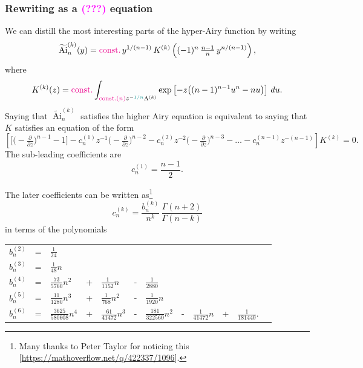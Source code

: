\documentclass{article}
\DeclareMathOperator{\Ai}{Ai}
\begin{document}
\subsubsection{Rewriting as a \textcolor{magenta}{(???)} equation}
We can distill the most interesting parts of the hyper-Airy function by writing
\[ \widetilde{\Ai}^{(k)}_n(y) = \textcolor{magenta}{\text{const.}}\,y^{1/(n-1)}\,K^{(k)}\left((-1)^n\,\tfrac{n-1}{n}\,y^{n/(n-1)}\right), \]
where
\begin{equation}
K^{(k)}(z) = \textcolor{magenta}{\text{const.}} \int_{\textcolor{magenta}{\text{const.}(n)} z^{-\textcolor{DarkCyan}{1/n}}\Lambda^{(k)}} \exp\left[-z\big((n-1)^{n-1} u^n - nu\big)\right]\,du.
\end{equation}
Saying that $\widetilde{\Ai}^{(k)}_n$ satisfies the higher Airy equation is equivalent to saying that $K$ satisfies an equation of the form
\begin{equation}\label{eqn:higher-Airy}
\left[ \big[ \big({-}\tfrac{\partial}{\partial z}\big)^{n-1} - 1 \big] - c_n^{(1)} z^{-1} \big({-}\tfrac{\partial}{\partial z}\big)^{n-2} - c_n^{(2)} z^{-2} \big({-}\tfrac{\partial}{\partial z}\big)^{n-3} - \ldots - c_n^{(n-1)} z^{-(n-1)} \right] K^{(k)} = 0.
\end{equation}
The sub-leading coefficients are 
\[ c_n^{(1)} = \frac{n-1}{2}. \]

The later coefficients can be written as\footnote{Many thanks to Peter Taylor for noticing this [\url{https://mathoverflow.net/q/422337/1096}].}
\[ c_n^{(k)} = \frac{b_n^{(k)}}{n^k}\,\frac{\Gamma(n+2)}{\Gamma(n-k)} \]
in terms of the polynomials

\begin{tabular}{llllllllllll}
$b_n^{(2)}$ & = & $\frac{1}{24}$ \\
$b_n^{(3)}$ & = & $\frac{1}{48} n$ \\
$b_n^{(4)}$ & = & $\frac{73}{5760} n^2$ & + & $\frac{1}{1152} n$ & - & $\frac{1}{2880}$ \\
$b_n^{(5)}$ & = & $\frac{11}{1280} n^{3}$ & + & $\frac{1}{768} n^{2}$ & - & $\frac{1}{1920} n$ \\
$b_n^{(6)}$ & = & $\frac{3625}{580608} n^{4}$ & + & $\frac{61}{41472} n^{3}$ & - & $\frac{181}{322560} n^{2}$ & - & $\frac{1}{41472} n$ & + & $\frac{1}{181440}$. 
\end{tabular}

\vspace{5mm}
\end{document}
